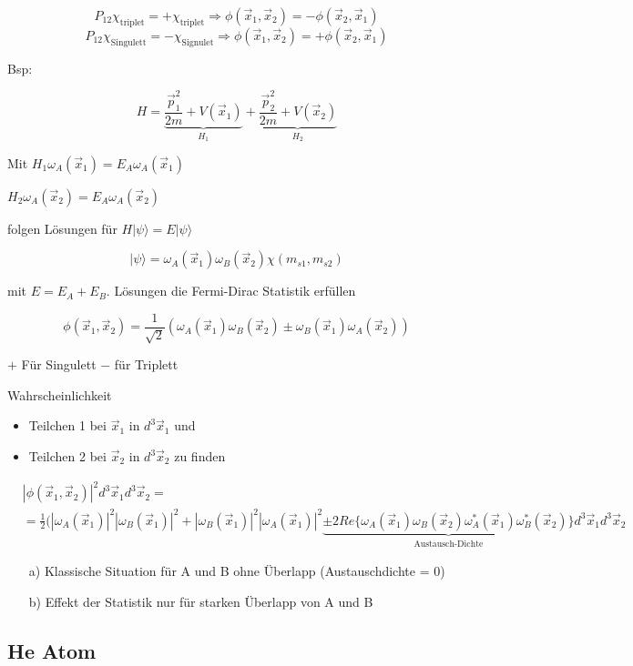 \[P_{12}\chi_{\text{triplet}}= +\chi_{\text{triplet}} \Rightarrow \phi(\vec x_1,\vec x_2) = -\phi(\vec x_2,\vec x_1)\]
\[P_{12}\chi_{\text{Singulett}}= -\chi_{\text{Signulet}} \Rightarrow \phi(\vec x_1,\vec x_2) = +\phi(\vec x_2,\vec x_1)\]

Bsp:

\[H = \underbrace{\frac{\vec p_1^2}{2m}+V(\vec x_1)}_{H_1}+ \underbrace{\frac{\vec p_2^2}{2m}+V(\vec x_2)}_{H_2} \]

Mit \(H_{1}\omega_A(\vec x_1) = E_A\omega_A(\vec x_1)\)

\(H_{2}\omega_A(\vec x_2) = E_A\omega_A(\vec x_2)\)

folgen Lösungen für \(H|\psi\rangle =E|\psi\rangle \)

\[|\psi\rangle = \omega_A(\vec x_1) \omega_B(\vec x_2) \chi (m_{s1},m_{s2})\]

mit \(E= E_A+E_B\). Lösungen die Fermi-Dirac Statistik erfüllen

\[\phi(\vec x_1,\vec x_2) = \frac{1}{\sqrt{2}}(\omega_A(\vec x_1) \omega_B(\vec x_2) \pm \omega_B(\vec x_1) \omega_A(\vec x_2)) \]

\(+\) Für Singulett \(-\) für Triplett

Wahrscheinlichkeit

\begin{itemize}
\item Teilchen 1 bei \(\vec x_1\) in \(d^3\vec x_1\) und
\item Teilchen 2 bei \(\vec x_2\) in \(d^3\vec x_2\) zu finden
\end{itemize}


\begin{align}
&|\phi(\vec x_1,\vec x_2)|^2 d^3\vec x_1 d^3\vec x_2 =\\
&= \frac{1}{2}(|\omega_A(\vec x_1)|^2|\omega_B(\vec x_1)|^2+|\omega_B(\vec x_1)|^2|\omega_A(\vec x_1)|^2 \underbrace{ \pm 2Re\{\omega_A(\vec x_1) \omega_B(\vec x_2)\omega_A^*(\vec x_1) \omega_B^*(\vec x_2) \}}_{\text{Austausch-Dichte}}d^3\vec x_1d^3\vec x_2
\end{align}

\begin{enumerate}
\item[a)] Klassische Situation für A und B ohne Überlapp (Austauschdichte = 0)
\item[b)] Effekt der Statistik nur für starken Überlapp von A und B
\end{enumerate}


\subsection{He Atom}

